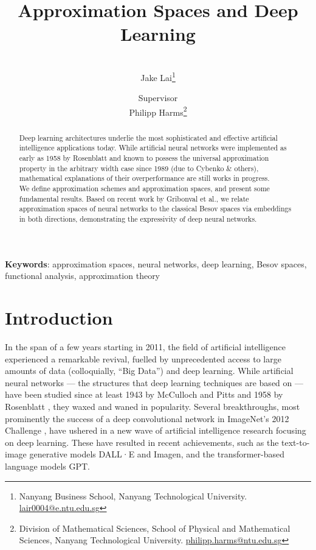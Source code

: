 \documentclass{article}
\theoremstyle{definition}
\theoremstyle{remark}
\begin{document}
\title{Approximation Spaces and Deep Learning}
\author{
\\[-7pt] Jake Lai\thanks{Nanyang Business School, Nanyang Technological University. \url{lair0004@e.ntu.edu.sg}}
\and
{\normalsize Supervisor} \\ Philipp Harms\thanks{Division of Mathematical Sciences, School of Physical and Mathematical Sciences, Nanyang Technological University. \url{philipp.harms@ntu.edu.sg}}
}
\date{}
\maketitle

\begin{abstract}
\noindent Deep learning architectures underlie the most sophisticated and effective artificial intelligence applications today. While artificial neural networks were implemented as early as 1958 by Rosenblatt and known to possess the universal approximation property in the arbitrary width case since 1989 (due to Cybenko \& others), mathematical explanations of their overperformance are still works in progress.
\\[5pt]
We define approximation schemes and approximation spaces, and present some fundamental results. Based on recent work by Gribonval et al., we relate approximation spaces of neural networks to the classical Besov spaces via embeddings in both directions, demonstrating the expressivity of deep neural networks.
\end{abstract}

\textbf{Keywords}: approximation spaces, neural networks, deep learning, Besov spaces, functional analysis, approximation theory



\section{Introduction}
In the span of a few years starting in 2011, the field of artificial intelligence experienced a remarkable revival, fuelled by unprecedented access to large amounts of data (colloquially, “Big Data”) and deep learning. While artificial neural networks --- the structures that deep learning techniques are based on --- have been studied since at least 1943 by McCulloch and Pitts \cite{mcculloch_logical_1943} and 1958 by Rosenblatt \cite{rosenblatt_perceptron_1958}, they waxed and waned in popularity. Several breakthroughs, most prominently the success of a deep convolutional network in ImageNet’s 2012 Challenge \cite{krizhevsky_imagenet_2012}, have ushered in a new wave of artificial intelligence research focusing on deep learning. These have resulted in recent achievements, such as the text-to-image generative models DALL·E and Imagen, and the transformer-based language models GPT.
\end{document}
